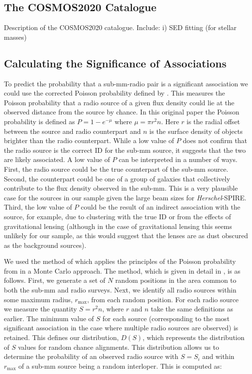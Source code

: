\subsection{The COSMOS2020 Catalogue}

{\color{red}Description of the COSMOS2020 catalogue. Include: i) SED fitting (for stellar masses)}

\subsection{Calculating the Significance of Associations}
\label{sec:radio_significance}

To predict the probability that a sub-mm-radio pair is a significant association we could use the corrected Poisson probability defined by \citealt{Downes_1986}. This measures the Poisson probability that a radio source of a given flux density could lie at the observed distance from the source by chance. In this original paper the Poisson probability is defined as $P = 1-e^{-\mu}$ where $\mu = \pi r^2n$. Here $r$ is the radial offset between the source and radio counterpart and $n$ is the surface density of objects brighter than the radio counterpart. While a low value of $P$ does not confirm that the radio source is the correct ID for the sub-mm source, it suggests that the two are likely associated. A low value of $P$ can be interpreted in a number of ways. First, the radio source could be the true counterpart of the sub-mm source. Second, the counterpart could be one of a group of galaxies that collectively contribute to the flux density observed in the sub-mm. This is a very plausible case for the sources in our sample given the large beam sizes for \textit{Herschel}-SPIRE. Third, the low value of $P$ could be the result of an indirect association with the source, for example, due to clustering with the true ID or from the effects of gravitational lensing (although in the case of gravitational lensing this seems unlikely for our sample, as this would suggest that the lenses are as dust obscured as the background sources).

We used the method of \citealt{Lilly_1999} which applies the principles of the Poisson probability from \citealt{Downes_1986} in a Monte Carlo approach. The method, which is given in detail in \citealt{Dye_2009}, is as follows. First, we generate a set of $N$ random positions in the area common to both the sub-mm and radio surveys. Next, we identify all radio sources within some maximum radius, $r_{\textrm{max}}$, from each random position. For each radio source we measure the quantity $S = r^2n$, where $r$ and $n$ take the same definitions as earlier. The minimum value of $S$ for each source (corresponding to the most significant association in the case where multiple radio sources are observed) is retained. This defines our distribution, $D(S)$, which represents the distribution of $S$ values for random chance alignments. This distribution allows us to determine the probability of an observed radio source with $S = S_i$ and within $r_{\textrm{max}}$ of a sub-mm source being a random interloper. This is computed as:

